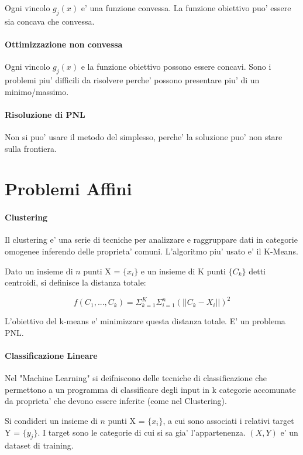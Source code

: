 Ogni vincolo $g_j(x)$ e' una funzione convessa. La funzione obiettivo puo' essere sia concava che convessa.

\paragraph{Ottimizzazione non convessa}

Ogni vincolo $g_j(x)$ e la funzione obiettivo possono essere concavi.
Sono i problemi piu' difficili da risolvere perche' possono presentare piu' di un minimo/massimo.

\paragraph{Risoluzione di PNL}

Non si puo' usare il metodo del simplesso, perche' la soluzione puo' non stare sulla frontiera.

\section{Problemi Affini}

\paragraph{Clustering}

Il clustering e' una serie di tecniche per analizzare e raggruppare dati in categorie omogenee inferendo delle proprieta' comuni. L'algoritmo piu' usato e' il K-Means.

Dato un insieme di $n$ punti X = $\{x_i\}$ e un insieme di K punti $\{C_k\}$ detti centroidi, si definisce la distanza totale:

\[
    f(C_1,...,C_k) = \Sigma ^ K _ {k=1} \Sigma ^ n _ {i=1} (||C_k - X_i||)^2
\]

L'obiettivo del k-means e' minimizzare questa distanza totale. E' un problema PNL.

\paragraph{Classificazione Lineare}

Nel "Machine Learning" si deifniscono delle tecniche di classificazione che permettono a un programma di classificare degli input in k categorie accomunate da proprieta' che devono essere inferite (come nel Clustering).

Si condideri un insieme di $n$ punti X = $\{x_i\}$, a cui sono associati i relativi target Y = $\{y_j\}$.
I target sono le categorie di cui si sa gia' l'appartenenza. $(X,Y)$ e' un dataset di training.

